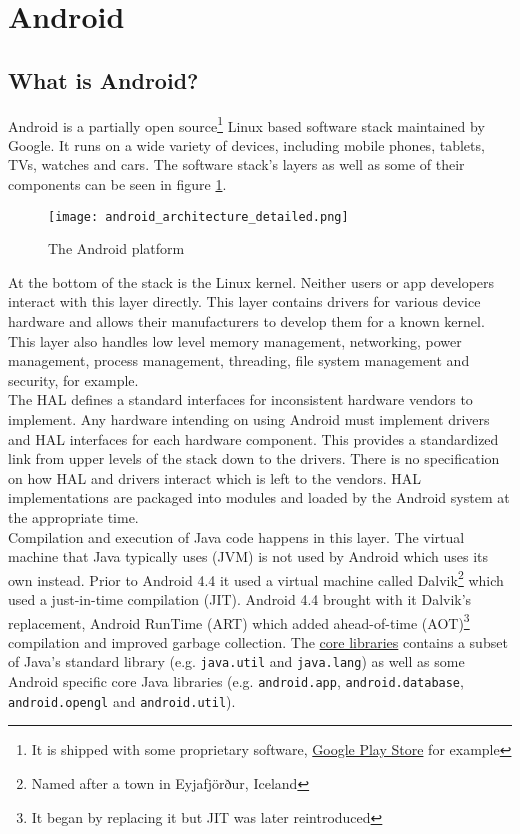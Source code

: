 \graphicspath{{./lab00/Images/}}

\maketocpage

\section{Android}
\subsection{What is Android?}
Android is a partially open source\footnote{It is shipped with some proprietary software, \href{https://play.google.com/store?hl=en}{Google Play Store} for example} Linux based software stack maintained by Google. It runs on a wide variety of devices, including mobile phones, tablets, TVs, watches and cars. The software stack's layers as well as some of their components can be seen in figure \ref{fig:droidarc}.

\begin{figure}[H]
\centering
\texttt{[image: android\_architecture\_detailed.png]}
\caption{The Android platform}
\label{fig:droidarc}
\end{figure}

At the bottom of the stack is the Linux kernel. Neither users or app developers interact with this layer directly. This layer contains drivers for various device hardware and allows their manufacturers to develop them for a known kernel. This layer also handles low level memory management, networking, power management, process management, threading, file system management and security, for example.\\

The HAL defines a standard interfaces for inconsistent hardware vendors to implement. Any hardware intending on using Android must implement drivers and HAL interfaces for each hardware component. This provides a standardized link from upper levels of the stack down to the drivers. There is no specification on how HAL and drivers interact which is left to the vendors. HAL implementations are packaged into modules and loaded by the Android system at the appropriate time.\\

Compilation and execution of Java code happens in this layer. The virtual machine that Java typically uses (JVM) is not used by Android which uses its own instead. Prior to Android 4.4 it used a virtual machine called Dalvik\footnote{Named after a town in Eyjafjörður, Iceland} which used a just-in-time compilation (JIT). Android 4.4 brought with it Dalvik's replacement, Android RunTime (ART) which added ahead-of-time (AOT)\footnote{It began by replacing it but JIT was later reintroduced} compilation and improved garbage collection. The \href{https://developer.android.com/reference/classes.html}{core libraries} contains a subset of Java's standard library (e.g. \texttt{java.util} and \texttt{java.lang}) as well as some Android specific core Java libraries (e.g. \texttt{android.app}, \texttt{android.database}, \texttt{android.opengl} and \texttt{android.util}).\\

